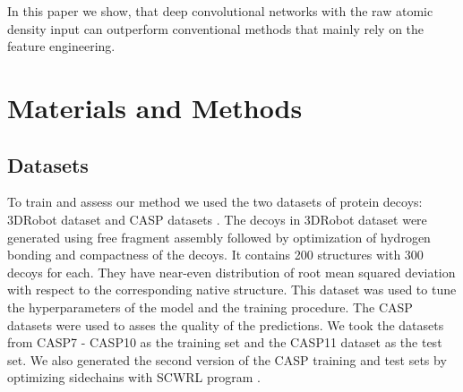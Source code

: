 \documentclass[a4paper,10pt]{article}
\begin{document}
In this paper we show, that deep convolutional networks with the raw atomic density input can outperform conventional methods that mainly rely on the feature engineering.

\section{Materials and Methods}
\subsection{Datasets}
To train and assess our method we used the two datasets of protein decoys: 3DRobot dataset \cite{} and CASP datasets \cite{}. The decoys in 3DRobot dataset 
were generated using free fragment assembly followed by optimization of hydrogen bonding and compactness of the decoys. It contains 200 structures with 300 decoys
for each. They have near-even distribution of root mean squared deviation with respect to the corresponding native structure. This dataset was used to tune the 
hyperparameters of the model and the training procedure.
The CASP datasets were used to asses the quality of the predictions. We took the datasets from CASP7 - CASP10 as the training set and the CASP11 dataset as the test set.
We also generated the second version of the CASP training and test sets by optimizing sidechains with SCWRL program \cite{}.
\end{document}
